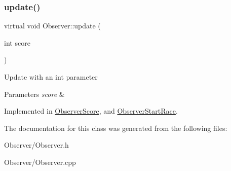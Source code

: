 \mbox{\label{classObserver_a4b9e6fbc74e7ae6971b2afe462ab5a87}} 
\subsubsection{\texorpdfstring{update()}{update()}}
{\footnotesize\ttfamily virtual void Observer\+::update (\begin{DoxyParamCaption}\item[{int}]{score }\end{DoxyParamCaption})\hspace{0.3cm}{\ttfamily [pure virtual]}}

Update with an int parameter 
\begin{DoxyParams}{Parameters}
{\em score} & \\
\hline
\end{DoxyParams}


Implemented in \hyperlink{classObserverScore_a1cb10ae5056c103436e00158cf90d5e4}{Observer\+Score}, and \hyperlink{classObserverStartRace_aa810164d0877c5597ec06adab29b7981}{Observer\+Start\+Race}.



The documentation for this class was generated from the following files\+:\begin{DoxyCompactItemize}
\item 
Observer/Observer.\+h\item 
Observer/Observer.\+cpp\end{DoxyCompactItemize}
